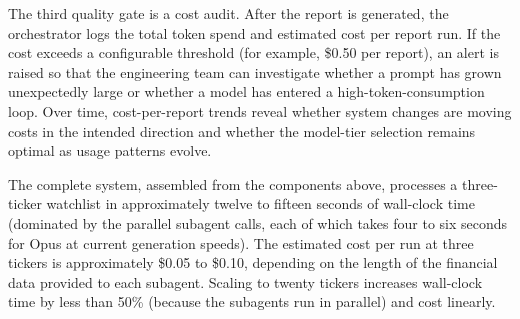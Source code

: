 The third quality gate is a cost audit. After the report is generated, the orchestrator
logs the total token spend and estimated cost per report run. If the cost exceeds a
configurable threshold (for example, \$0.50 per report), an alert is raised so that
the engineering team can investigate whether a prompt has grown unexpectedly large or
whether a model has entered a high-token-consumption loop. Over time, cost-per-report
trends reveal whether system changes are moving costs in the intended direction and
whether the model-tier selection remains optimal as usage patterns evolve.

The complete system, assembled from the components above, processes a three-ticker
watchlist in approximately twelve to fifteen seconds of wall-clock time (dominated by
the parallel subagent calls, each of which takes four to six seconds for Opus at
current generation speeds). The estimated cost per run at three tickers is
approximately \$0.05 to \$0.10, depending on the length of the financial data provided
to each subagent. Scaling to twenty tickers increases wall-clock time by less than
50\% (because the subagents run in parallel) and cost linearly.
